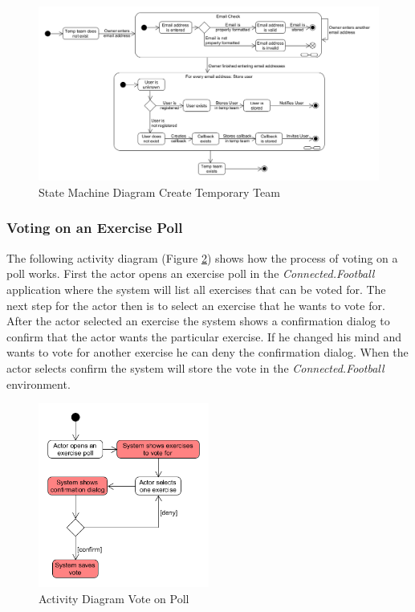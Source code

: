 \begin{figure}[H]
    \begin{center}
        \includegraphics[width=1\textwidth]{images/diagrams/state_machine_diagrams/StateDiagram_CreateTempTeam.png}
        \caption{State Machine Diagram Create Temporary Team}
        \label{fig:state_machine_diagram_create_temp_team}
    \end{center}
\end{figure}

\subsubsection{Voting on an Exercise Poll}
\label{sssec:voting_on_exercise_poll}
The following activity diagram (Figure \ref{fig:activity_diagram_vote_on_poll}) shows how the process of voting on a poll works. First the actor opens an exercise poll in the \textit{Connected.Football} application where the system will list all exercises that can be voted for. The next step for the actor then is to select an exercise that he wants to vote for. After the actor selected an exercise the system shows a confirmation dialog to confirm that the actor wants the particular exercise. If he changed his mind and wants to vote for another exercise he can deny the confirmation dialog. When the actor selects confirm the system will store the vote in the \textit{Connected.Football} environment. 

\begin{figure}[H]
    \begin{center}
        \includegraphics[width=0.5\textwidth]{images/diagrams/activity_diagrams/ActivityDiagram_VoteOnExercisePoll.png}
        \caption{Activity Diagram Vote on Poll}
        \label{fig:activity_diagram_vote_on_poll}
    \end{center}
\end{figure}

